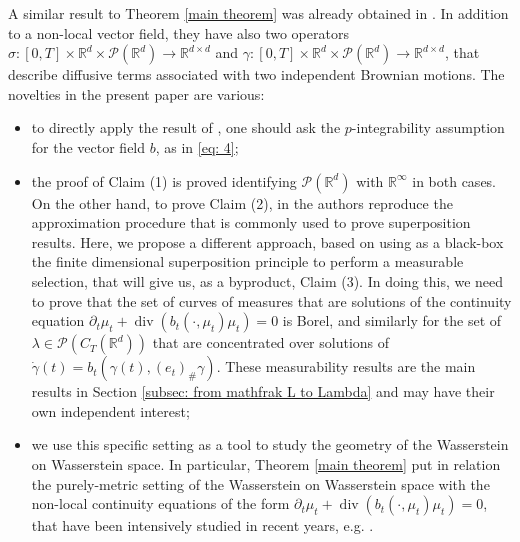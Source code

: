 \documentclass[10pt,leqno]{amsart}
\numberwithin{equation}{section}
\newcommand{\R}{\mathbb{R}}
\newcommand{\PP}{\mathcal{P}}
\begin{document}
A similar result to Theorem \ref{main theorem} was already obtained in \cite{lacker2022superposition}. In addition to a non-local vector field, they have also two operators $\sigma:[0,T]\times \R^d \times \PP(\R^d) \to \R^{d\times d}$ and $\gamma:[0,T]\times \R^d \times \PP(\R^d) \to \R^{d\times d}$, that describe diffusive terms associated with two independent Brownian motions. The novelties in the present paper are various:
\begin{itemize}
    \item to directly apply the result of \cite{lacker2022superposition}, one should ask the $p$-integrability assumption for the vector field $b$, as in \eqref{eq: 4};
    \item the proof of Claim (1) is proved identifying $\PP(\R^d)$ with $\R^\infty$ in both cases. On the other hand, to prove Claim (2), in \cite{lacker2022superposition} the authors reproduce the approximation procedure that is commonly used to prove superposition results. Here, we propose a different approach, based on using as a black-box the finite dimensional superposition principle to perform a measurable selection, that will give us, as a byproduct, Claim (3). In doing this, we need to prove that the set of curves of measures that are solutions of the continuity equation $\partial_t\mu_t + \operatorname{div}(b_t(\cdot,\mu_t)\mu_t) = 0$ is Borel, and similarly for the set of $\lambda\in \PP(C_T(\R^d))$ that are concentrated over solutions of $\dot{\gamma}(t) = b_t(\gamma(t),(e_t)_\#\gamma)$. These measurability results are the main results in Section \ref{subsec: from mathfrak L to Lambda} and may have their own independent interest;
    \item we use this specific setting as a tool to study the geometry of the Wasserstein on Wasserstein space. In particular, Theorem \ref{main theorem} put in relation the purely-metric setting of the Wasserstein on Wasserstein space with the non-local continuity equations of the form $\partial_t\mu_t + \operatorname{div}(b_t(\cdot,\mu_t)\mu_t) = 0$, that have been intensively studied in recent years, e.g. \cite{bonnet2021differential,bonnet2024caratheodory, cavagnari2023dissipative, cavagnari2023lagrangian}.
\end{itemize}

\end{document}
